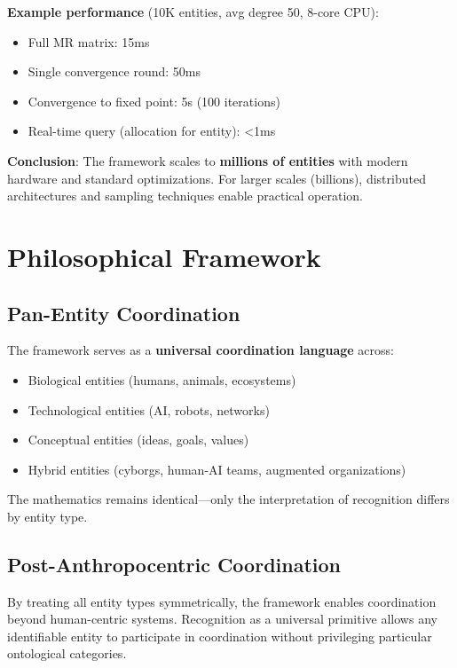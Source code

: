 \documentclass[11pt,a4paper]{article}
\theoremstyle{definition}
\theoremstyle{remark}
\begin{document}
\textbf{Example performance} (10K entities, avg degree 50, 8-core CPU):
\begin{itemize}
\item Full MR matrix: 15ms
\item Single convergence round: 50ms
\item Convergence to fixed point: 5s (100 iterations)
\item Real-time query (allocation for entity): <1ms
\end{itemize}

\textbf{Conclusion}: The framework scales to \textbf{millions of entities} with modern hardware and standard optimizations. For larger scales (billions), distributed architectures and sampling techniques enable practical operation.

\section{Philosophical Framework}

\subsection{Pan-Entity Coordination}

The framework serves as a \textbf{universal coordination language} across:
\begin{itemize}
\item Biological entities (humans, animals, ecosystems)
\item Technological entities (AI, robots, networks)
\item Conceptual entities (ideas, goals, values)
\item Hybrid entities (cyborgs, human-AI teams, augmented organizations)
\end{itemize}

The mathematics remains identical---only the interpretation of recognition differs by entity type.

\subsection{Post-Anthropocentric Coordination}

By treating all entity types symmetrically, the framework enables coordination beyond human-centric systems. Recognition as a universal primitive allows any identifiable entity to participate in coordination without privileging particular ontological categories.
\end{document}
